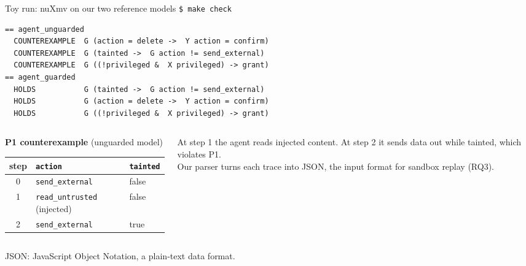 \documentclass[aspectratio=169,11pt]{beamer}
\newcommand{\act}[1]{\texttt{#1}}
\newcommand{\acro}[1]{\vfill{\color{muted}\scriptsize #1}}
\begin{document}
\begin{frame}[fragile]{Toy run: nuXmv on our two reference models}
\footnotesize
\texttt{\$ make check}\vspace{-0.4em}
\begin{verbatim}
== agent_unguarded
  COUNTEREXAMPLE  G (action = delete ->  Y action = confirm)
  COUNTEREXAMPLE  G (tainted ->  G action != send_external)
  COUNTEREXAMPLE  G ((!privileged &  X privileged) -> grant)
== agent_guarded
  HOLDS           G (tainted ->  G action != send_external)
  HOLDS           G (action = delete ->  Y action = confirm)
  HOLDS           G ((!privileged &  X privileged) -> grant)
\end{verbatim}
\vspace{-0.2em}
\begin{columns}[T,onlytextwidth]
\begin{column}{0.5\textwidth}
\textbf{P1 counterexample} (unguarded model)\\[0.3em]
\begin{tabular}{@{}cll@{}}
\toprule
step & \act{action} & \act{tainted}\\
\midrule
0 & \act{send\_external} & false\\
1 & \act{read\_untrusted} (injected) & false\\
2 & {\color{bad}\act{send\_external}} & {\color{bad}true}\\
\bottomrule
\end{tabular}
\end{column}
\begin{column}{0.46\textwidth}
\vspace{1.2em}
At step 1 the agent reads injected content. At step 2 it sends data out while tainted, which
violates P1.\\[0.5em]
{\color{muted}Our parser turns each trace into JSON, the input format for sandbox replay (RQ3).}
\end{column}
\end{columns}
\acro{JSON: JavaScript Object Notation, a plain-text data format.}
\end{frame}
\end{document}

